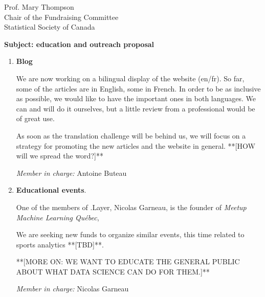 \documentclass[11pt, a4paper]{letter} %
\begin{document}
\begin{letter}{
	Prof. Mary Thompson\\
	Chair of the Fundraising Committee\\
	Statistical Society of Canada
	
	\bigskip
	\textbf{Subject: education and outreach proposal}%
}
\begin{enumerate}
	\quad We are lucky to have among us a professional graphic designer, Jean-Christophe Yelle, who created, at no cost, the logo that you can see in the head of the letter. Among the other things we wish to integrate to the community are personalized e-mail addresses (@dotlayer.org) for the administering members, reusable cups for our future events and organize more casual events where members have opportunity to chat togheter and invite new people to join and get in touch with the group. +++++++ **[WHAT MORE? - @steph @bute - membership fees here?]**
	
	\bigskip
	\emph{Member in charge:} Stéphane Caron\\
	
	\item \textbf{Blog}
	
	\quad We are now working on a bilingual display of the website (en/fr). So far, some of the articles are in English, some in French. In order to be as inclusive as possible, we would like to have the important ones in both languages. We can and will do it ourselves, but a little review from a professional would be of great use.
	
	\quad As soon as the translation challenge will be behind us, we will focus on a strategy for promoting the new articles and the website in general. **[HOW will we spread the word?]**
	
	\bigskip
	\emph{Member in charge:} Antoine Buteau\\
	
	\item \textbf{Educational events}.
	
	\quad One of the members of .Layer, Nicolas Garneau, is the founder of \emph{Meetup	Machine Learning Québec}, 
	
\quad We are seeking new funds to organize similar events, this time related to sports analytics **[TBD]**. 
	
**[MORE ON: WE WANT TO EDUCATE THE GENERAL PUBLIC ABOUT WHAT DATA SCIENCE CAN DO FOR THEM.]**
			
	\bigskip
	\emph{Member in charge:} Nicolas Garneau\\
	

\end{enumerate}
\end{letter}
\end{document}
